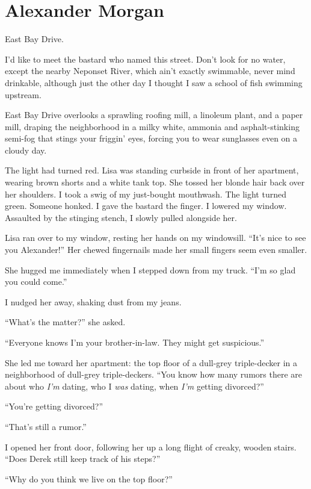 \chapter{Alexander Morgan}

\titlemark

East Bay Drive.

I'd like to meet the bastard who named this street. Don't look for no
water, except the nearby Neponset River, which ain't exactly swimmable,
never mind drinkable, although just the other day I thought I saw a
school of fish swimming upstream.

East Bay Drive overlooks a sprawling roofing mill, a linoleum plant, and
a paper mill, draping the neighborhood in a milky white, ammonia and
asphalt-stinking semi-fog that stings your friggin' eyes, forcing you to
wear sunglasses even on a cloudy day.

The light had turned red. Lisa was standing curbside in front of her
apartment, wearing brown shorts and a white tank top. She tossed her
blonde hair back over her shoulders. I took a swig of my just-bought
mouthwash. The light turned green. Someone honked. I gave the bastard
the finger. I lowered my window. Assaulted by the stinging stench, I
slowly pulled alongside her.

Lisa ran over to my window, resting her hands on my windowsill. ``It's
nice to see you Alexander!'' Her chewed fingernails made her small
fingers seem even smaller.

She hugged me immediately when I stepped down from my truck. ``I'm so
glad you could come.''

I nudged her away, shaking dust from my jeans.

``What's the matter?'' she asked.

``Everyone knows I'm your brother-in-law. They might get suspicious.''

She led me toward her apartment: the top floor of a dull-grey
triple-decker in a neighborhood of dull-grey triple-deckers. ``You know
how many rumors there are about who \emph{I'm} dating, who I \emph{was}
dating, when \emph{I'm} getting divorced?''

``You're getting divorced?''

``That's still a rumor.''

I opened her front door, following her up a long flight of creaky,
wooden stairs. ``Does Derek still keep track of his steps?''

``Why do you think we live on the top floor?''

